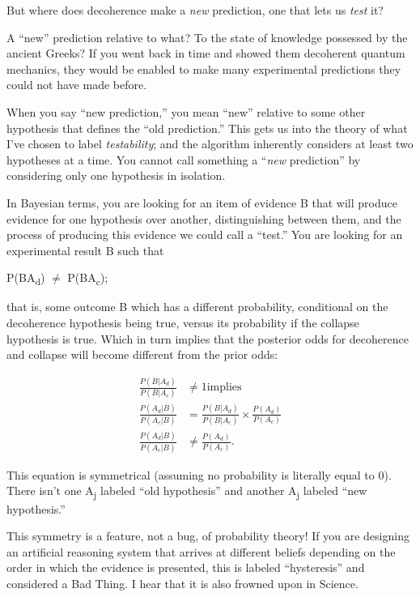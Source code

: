 {
 But where does decoherence make a \textit{new} prediction, one
that lets us \textit{test} it?}

{
 A ``new'' prediction relative
to what? To the state of knowledge possessed by the ancient Greeks? If
you went back in time and showed them decoherent quantum mechanics,
they would be enabled to make many experimental predictions they could
not have made before.}

{
 When you say ``new
prediction,'' you mean
``new'' relative to some other
hypothesis that defines the ``old
prediction.'' This gets us into the theory of what
I've chosen to label \textit{testability}; and the
algorithm inherently considers at least two hypotheses at a time. You
cannot call something a ``\textit{new}
prediction'' by considering only one hypothesis in
isolation.}

{
 In Bayesian terms, you are looking for an item of evidence B that
will produce evidence for one hypothesis over another, distinguishing
between them, and the process of producing this evidence we could call
a ``test.'' You are looking for an
experimental result B such that}

{\centering
 P(B{\textbar}A\textsubscript{d}) ${\neq}$
P(B{\textbar}A\textsubscript{c});
\par}


\bigskip

{
 that is, some outcome B which has a different probability,
conditional on the decoherence hypothesis being true, versus its
probability if the collapse hypothesis is true. Which in turn implies
that the posterior odds for decoherence and collapse will become
different from the prior odds:}

\begin{align*}
  \frac{P(B|A_d)}{P(B|A_c)} &\neq 1 \textrm{implies} \\
  \frac{P(A_d|B)}{P(A_c|B)} &= \frac{P(B|A_d)}{P(B|A_c)} \times \frac{P(A_d)}{P(A_c)} \\
  \frac{P(A_d|B)}{P(A_c|B)} &\neq \frac{P(A_d)}{P(A_c)} .
\end{align*}


\bigskip

{
 This equation is symmetrical (assuming no probability is literally
equal to 0). There isn't one A\textsubscript{j} labeled
``old hypothesis'' and another
A\textsubscript{j} labeled ``new
hypothesis.''}

{
 This symmetry is a feature, not a bug, of probability theory! If
you are designing an artificial reasoning system that arrives at
different beliefs depending on the order in which the evidence is
presented, this is labeled
``hysteresis'' and considered a Bad
Thing. I hear that it is also frowned upon in Science.}

